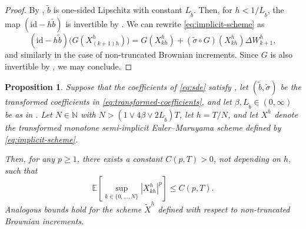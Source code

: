 \documentclass[onseside, final]{amsart}
\newtheorem{proposition}[theorem]{Proposition}
\theoremstyle{definition}
\newcommand{\N}{\mathbb N}
\newcommand{\E}{\mathbb E}
\newcommand{\id}{\mathrm{id}}
\numberwithin{equation}{section}
\begin{document}
		\begin{proof}
			By , $\tilde b$ is one-sided Lipschitz with constant $L_{\tilde b}$. Then, for $h < 1/L_{\tilde b}$, the map $(\id - h \tilde b)$ is invertible by . We can rewrite \eqref{eq:implicit-scheme} as
			\begin{equation}
				(\id - h \tilde b)\bigl(G(X^h_{(k + 1)h})\bigr) = G(X^h_{kh}) + (\tilde \sigma \circ G)(X^h_{kh})\Delta W^h_{k + 1},
			\end{equation}
			and similarly in the case of non-truncated Brownian increments. Since $G$ is also invertible by , we may conclude.
		\end{proof}
		
		\begin{proposition}\label{prop:implicit-euler-moment-bounds}
			Suppose that the coefficients of \eqref{eq:sde} satisfy , let $(\tilde b, \tilde \sigma)$ be the transformed coefficients in \eqref{eq:transformed-coefficients}, and let $\beta, L_{\tilde b} \in (0, \infty)$ be as in . Let $N \in \N$ with $N > (1 \vee 4\beta \vee 2 L_{\tilde b})T$, let $h = T/N$, and let $X^h$ denote the transformed monotone semi-implicit Euler--Maruyama scheme defined by \eqref{eq:implicit-scheme}.
			
			Then, for any $p \geq 1$, there exists a constant $C(p, T) > 0$, not depending on $h$, such that
			\begin{equation}\label{eq:moment-bound-implicit-scheme}
				\E\!\left[\sup_{k \in \{0, \dotsc, N\}}|X^h_{kh}|^p\right]\! \leq C(p, T).
			\end{equation}
			Analogous bounds hold for the scheme $\tilde X^h$ defined with respect to non-truncated Brownian increments.
		\end{proposition}
		
\end{document}
